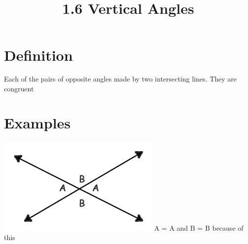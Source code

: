 \documentclass{article}
\begin{document}
	
	\setlength{\droptitle}{-5em}
	\title{1.6 Vertical Angles}
	\date{}
	\author{}
	\maketitle
	
	\section{Definition}
	Each of the pairs of opposite angles made by two intersecting lines.  \newline They are congruent
	\section{Examples}
	\includegraphics{pics/verticalangles.png}
	\newline A = A and B = B because of this
	
\end{document}

